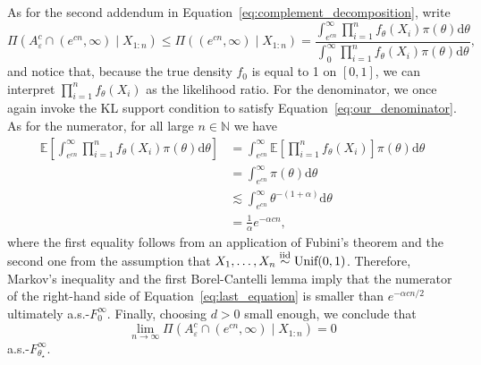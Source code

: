 \documentclass[11pt,twoside]{article}
\newcommand{\iid}{\overset{\textnormal{iid}}{\sim}}
\def\NN{\mathbb{N}}
\begin{document}
As for the second addendum in Equation~\eqref{eq:complement_decomposition}, write
%
\begin{equation}\label{eq:last_equation}
    \Pi(A_\varepsilon^c \cap (e^{cn},\infty)\mid X_{1:n}) \leq \Pi( (e^{cn},\infty)\mid X_{1:n}) = \frac{\int_{e^{cn}}^\infty \prod_{i=1}^n f_\theta(X_i) \pi(\theta) \mathrm d\theta}{\int_0^\infty\prod_{i=1}^n f_\theta(X_i) \pi(\theta) \mathrm d\theta},
\end{equation}
%
and notice that, because the true density $f_0$ is equal to 1 on $[0,1]$, we can interpret $\prod_{i=1}^n f_\theta(X_i)$ as the likelihood ratio. For the denominator, we once again invoke the KL support condition to satisfy Equation~\eqref{eq:our_denominator}. As for the numerator, for all large $n\in\NN$ we have
%
\begin{align*}
    \mathbb E\left[\int_{e^{cn}}^\infty \prod_{i=1}^n f_\theta(X_i) \pi(\theta) \mathrm d\theta \right] & = \int_{e^{cn}}^\infty \mathbb E\left[\prod_{i=1}^n f_\theta(X_i)\right] \pi(\theta) \mathrm d\theta\\
    & = \int_{e^{cn}}^\infty \pi(\theta) \mathrm d\theta \\
    & \lesssim \int_{e^{cn}}^\infty \theta^{-(1+\alpha)} \mathrm d\theta \\
    & =\frac{1}{\alpha}e^{-\alpha cn},
\end{align*}
%
where the first equality follows from an application of Fubini's theorem and the second one from the assumption that $X_1,\dots,X_n\iid \textnormal{Unif}(0,1)$. Therefore, Markov's inequality and the first Borel-Cantelli lemma imply that the numerator of the right-hand side of Equation~\eqref{eq:last_equation} is smaller than $e^{-\alpha cn/2}$ ultimately a.s.-$F_0^\infty$. Finally, choosing $d>0$ small enough, we conclude that
%
\begin{equation*}
    \lim_{n\to\infty}\Pi(A_\varepsilon^c \cap (e^{cn},\infty)\mid X_{1:n}) =0
\end{equation*}
%
a.s.-$F_{\theta_\star}^\infty$.



\clearpage

\end{document}
